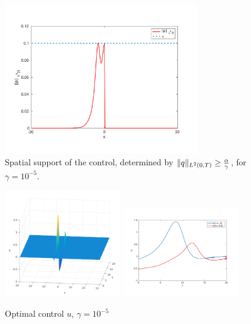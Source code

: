 \begin{figure}[!h]
\includegraphics[width = 0.75\textwidth]{images/norm2p.pdf}
\caption{Spatial support of the control, determined by $\lVert q\rVert_{L^2(0,T)}\geq \frac{\alpha}{\gamma}$, for $\gamma = 10^{-5}$.}
\label{supportIP}
\end{figure}

\begin{figure}[!h]
 \includegraphics[width = 0.45\textwidth]{images/ex2optcontrol3d.png}
 \includegraphics[width = 0.45\textwidth]{images/ex2utime.pdf}
 \caption{Optimal control $u$, $\gamma = 10^{-5}$}
 \label{recoveredcontrol}
\end{figure}



